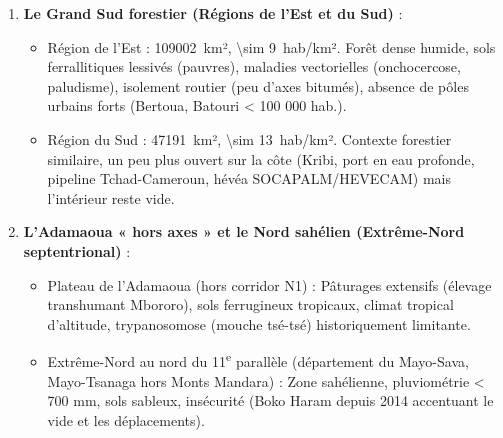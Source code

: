 \documentclass[11pt]{article}
\newcommand{\cle}[1]{{\popxbold\color{popdark}#1}}
\begin{document}
\begin{enumerate}
\item \textbf{Le Grand Sud forestier (Régions de l'Est et du Sud)} :
      \begin{itemize}
      \item \cle{Région de l'Est} : \SI{109 002}{km²}, \SI{\sim 9}{hab/km²}. Forêt dense humide, sols ferrallitiques lessivés (pauvres), maladies vectorielles (onchocercose, paludisme), isolement routier (peu d'axes bitumés), absence de pôles urbains forts (Bertoua, Batouri < 100 000 hab.).
      \item \cle{Région du Sud} : \SI{47 191}{km²}, \SI{\sim 13}{hab/km²}. Contexte forestier similaire, un peu plus ouvert sur la côte (Kribi, port en eau profonde, pipeline Tchad-Cameroun, hévéa SOCAPALM/HEVECAM) mais l'intérieur reste vide.
      \end{itemize}
\item \textbf{L'Adamaoua « hors axes » et le Nord sahélien (Extrême-Nord septentrional)} :
      \begin{itemize}
      \item Plateau de l'Adamaoua (hors corridor N1) : Pâturages extensifs (élevage transhumant Mbororo), sols ferrugineux tropicaux, climat tropical d'altitude, trypanosomose (mouche tsé-tsé) historiquement limitante.
      \item Extrême-Nord au nord du 11\textsuperscript{e} parallèle (département du Mayo-Sava, Mayo-Tsanaga hors Monts Mandara) : Zone sahélienne, pluviométrie < 700 mm, sols sableux, insécurité (Boko Haram depuis 2014 accentuant le vide et les déplacements).
      \end{itemize}
\end{enumerate}
\end{document}
